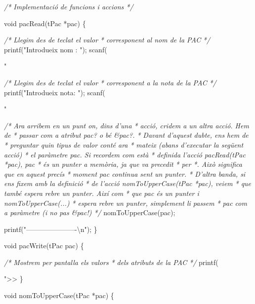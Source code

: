 \documentclass[]{book}
\newenvironment{Shaded}{\begin{snugshade}}{\end{snugshade}}
\newcommand{\DataTypeTok}[1]{\textcolor[rgb]{0.13,0.29,0.53}{#1}}
\newcommand{\SpecialCharTok}[1]{\textcolor[rgb]{0.00,0.00,0.00}{#1}}
\newcommand{\StringTok}[1]{\textcolor[rgb]{0.31,0.60,0.02}{#1}}
\newcommand{\CommentTok}[1]{\textcolor[rgb]{0.56,0.35,0.01}{\textit{#1}}}
\newcommand{\NormalTok}[1]{#1}
\begin{document}
\begin{Shaded}
\begin{Highlighting}[]
\CommentTok{/* Implementació de funcions i accions */}

\DataTypeTok{void}\NormalTok{ pacRead(tPac *pac) \{}

    \CommentTok{/* Llegim des de teclat el valor}
\CommentTok{     * corresponent al nom de la PAC}
\CommentTok{     */}
\NormalTok{    printf(}\StringTok{"Introdueix nom : "}\NormalTok{);}
\NormalTok{    scanf(}\StringTok{"%

    \CommentTok{/* Llegim des de teclat el valor}
\CommentTok{     * corresponent a la nota de la PAC}
\CommentTok{     */}
\NormalTok{    printf(}\StringTok{"Introdueix nota: "}\NormalTok{);}
\NormalTok{    scanf(}\StringTok{"%
    
    \CommentTok{/* Ara arribem en un punt on, dins d'una}
\CommentTok{     * acció, cridem a un altra acció. Hem de }
\CommentTok{     * passar com a atribut pac? o bé &pac?. }
\CommentTok{     * Davant d'aquest dubte, ens hem de }
\CommentTok{     * preguntar quin tipus de valor conté ara}
\CommentTok{     * mateix (abans d'executar la següent acció)}
\CommentTok{     * el paràmetre pac. Si recordem com està }
\CommentTok{     * definida l'acció pacRead(tPac *pac), pac}
\CommentTok{     * és un punter a memòria, ja que va precedit}
\CommentTok{     * per *. Això significa que en aquest precís}
\CommentTok{     * moment pac continua sent un punter.}
\CommentTok{     * D'altra banda, si ens fixem amb la definició}
\CommentTok{     * de l'acció nomToUpperCase(tPac *pac), veiem}
\CommentTok{     * que també espera rebre un punter. Així com }
\CommentTok{     * que pac és un punter i nomToUpperCase(...)}
\CommentTok{     * espera rebre un punter, simplement li passem}
\CommentTok{     * pac com a paràmetre (i no pas &pac!)}
\CommentTok{     */}
\NormalTok{    nomToUpperCase(pac);}
    
\NormalTok{    printf(}\StringTok{"----------------------}\SpecialCharTok{\textbackslash{}n}\StringTok{"}\NormalTok{);}
\NormalTok{\}}

\DataTypeTok{void}\NormalTok{ pacWrite(tPac pac) \{}

    \CommentTok{/* Mostrem per pantalla els valors}
\CommentTok{     * dels atributs de la PAC}
\CommentTok{     */}
\NormalTok{    printf(}\StringTok{">> %
\NormalTok{\}}

\DataTypeTok{void}\NormalTok{ nomToUpperCase(tPac *pac) \{}
    
}}}
\end{Highlighting}
\end{Shaded}
\end{document}
